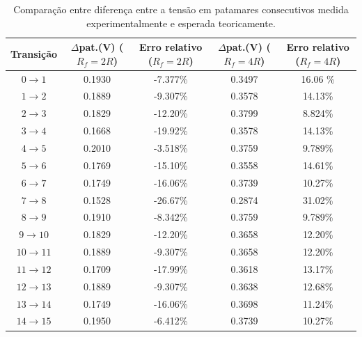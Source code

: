 \documentclass[a4paper, oneside]{article}
\begin{document}
\begin{table}[ht]
	\centering
	\caption{Comparação entre diferença entre a tensão em patamares consecutivos medida experimentalmente e esperada teoricamente.}
	\label{tab:difPat_exp}
	\begin{tabular}{ccccc}
		Transição & $\Delta$pat.(V) ($\!R_f\!=\!2R$) & Erro relativo ($\!R_f\!=\!2R$)& $\Delta$pat.(V) ($\!R_f\!=\!4R$) & Erro relativo ($\!R_f\!=\!4R$)\\
		\hline
		$0\rightarrow1$  & 0.1930 & -7.377\% & 0.3497 & 16.06 \%\\ 
		$1\rightarrow2$   & 0.1889 & -9.307\% & 0.3578 & 14.13\%\\ 
		$2\rightarrow3$   & 0.1829 & -12.20\% & 0.3799 & 8.824\%\\ 
		$3\rightarrow4$   & 0.1668 & -19.92\% & 0.3578 & 14.13\%\\ 
		$4\rightarrow5$   & 0.2010 & -3.518\% & 0.3759 & 9.789\%\\ 
		$5\rightarrow6$   & 0.1769 & -15.10\% & 0.3558 & 14.61\%\\ 
		$6\rightarrow7$   & 0.1749 & -16.06\% & 0.3739 & 10.27\%\\ 
		$7\rightarrow8$   & 0.1528 & -26.67\% & 0.2874 & 31.02\%\\ 
		$8\rightarrow9$   & 0.1910 & -8.342\% & 0.3759 & 9.789\%\\ 
		$9\rightarrow10$   & 0.1829 & -12.20\% & 0.3658 & 12.20\%\\ 
		$10\rightarrow11$  & 0.1889 & -9.307\% & 0.3658 & 12.20\%\\ 
		$11\rightarrow12$  & 0.1709 & -17.99\% & 0.3618 & 13.17\%\\ 
		$12\rightarrow13$  & 0.1889 & -9.307\% & 0.3638 & 12.68\%\\ 
		$13\rightarrow14$  & 0.1749 & -16.06\% & 0.3698 & 11.24\%\\ 
		$14\rightarrow15$  & 0.1950 & -6.412\% & 0.3739 & 10.27\%\\
		\hline
	\end{tabular}
\end{table}
\end{document}
